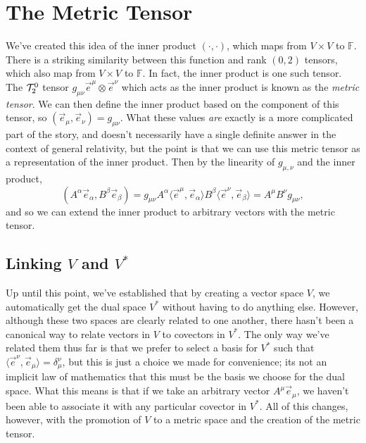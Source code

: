 \chapter{The Metric Tensor}
We've created this idea of the inner product $(\cdot,\cdot)$, which maps from $V \times V$ to $\mathbb{F}$.
There is a striking similarity between this function and rank $(0,2)$ tensors, which also map from $V \times V$ to $\mathbb{F}$.
In fact, the inner product is one such tensor.
The $\mathcal{T}^0_2$ tensor $g_{\mu\nu} \vec{e}^\mu \otimes \vec{e}^\nu$ which acts as the inner product is known as the \emph{metric tensor}.
We can then define the inner product based on the component of this tensor, so $(\vec{e}_\mu,\vec{e}_\nu) = g_{\mu\nu}$.
What these values \emph{are} exactly is a more complicated part of the story, and doesn't necessarily have a single definite answer in the context of general relativity, but the point is that we can use this metric tensor as a representation of the inner product.
Then by the linearity of $g_{\mu,\nu}$ and the inner product,
\[ (A^\alpha \vec{e}_\alpha, B^\beta \vec{e}_\beta) = g_{\mu\nu} A^\alpha \langle \vec{e}^\mu, \vec{e}_\alpha \rangle B^\beta \langle \vec{e}^\nu, \vec{e}_\beta \rangle = A^\mu B^\nu g_{\mu\nu}, \]
and so we can extend the inner product to arbitrary vectors with the metric tensor.

\section{Linking $V$ and $V^*$}
Up until this point, we've established that by creating a vector space $V$, we automatically get the dual space $V^*$ without having to do anything else.
However, although these two spaces are clearly related to one another, there hasn't been a canonical way to relate vectors in $V$ to covectors in $V^*$.
The only way we've related them thus far is that we prefer to select a basis for $V^*$ such that $\langle \vec{e}^\nu, \vec{e}_\mu \rangle = \delta_\mu^\nu$, but this is just a choice we made for convenience; its not an implicit law of mathematics that this must be the basis we choose for the dual space.
What this means is that if we take an arbitrary vector $A^\mu \vec{e}_\mu$, we haven't been able to associate it with any particular covector in $V^*$.
All of this changes, however, with the promotion of $V$ to a metric space and the creation of the metric tensor.

